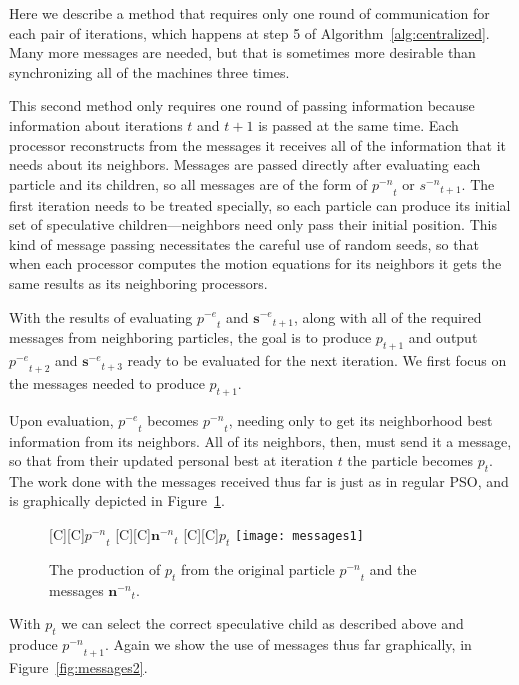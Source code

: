 \documentclass[smallcondensed]{svjour3}
\newcommand{\fig}[1]{Figure~\ref{fig:#1}}
\newcommand{\alg}[1]{Algorithm~\ref{alg:#1}}
\providecommand{\noeval}[1]{\ensuremath{#1^{-e}}}
\providecommand{\nonbest}[1]{\ensuremath{#1^{-n}}}
\providecommand{\p}{\ensuremath{p}}
\providecommand{\s}{\ensuremath{s}}
\providecommand{\sset}{\ensuremath{\mathbf{s}}}
\providecommand{\nset}{\ensuremath{\mathbf{n}}}
\begin{document}

Here we describe a method that requires only one round of communication for
each pair of iterations, which happens at step 5 of \alg{centralized}.  Many
more messages are needed, but that is sometimes more desirable than
synchronizing all of the machines three times.

This second method only requires one round of passing information because
information about iterations $t$ and $t+1$ is passed at the same time.  Each
processor reconstructs from the messages it receives all of the information
that it needs about its neighbors.  Messages are passed directly after
evaluating each particle and its children, so all messages are of the form of
$\nonbest{\p}_t$ or $\nonbest{\s}_{t+1}$.  The first iteration needs to be
treated specially, so each particle can produce its initial set of speculative
children---neighbors need only pass their initial position.  This kind of
message passing necessitates the careful use of random seeds, so that when each
processor computes the motion equations for its neighbors it gets the same
results as its neighboring processors.

With the results of evaluating $\noeval{\p}_t$ and $\noeval{\sset}_{t+1}$,
along with all of the required messages from neighboring particles, the goal is
to produce $\p_{t+1}$ and output $\noeval{\p}_{t+2}$ and $\noeval{\sset}_{t+3}$
ready to be evaluated for the next iteration.  We first focus on the messages
needed to produce $\p_{t+1}$.

Upon evaluation, $\noeval{\p}_t$ becomes $\nonbest{\p}_t$, needing only to get
its neighborhood best information from its neighbors.  All of its neighbors,
then, must send it a message, so that from their updated personal best at
iteration $t$ the particle becomes $\p_t$.  The work done with the messages
received thus far is just as in regular PSO, and is graphically depicted in 
\fig{messages1}.

\begin{figure}
  \centering
  [C][C]{$\nonbest{\p}_{t}$}
  [C][C]{$\nonbest{\nset}_{t}$}
  [C][C]{$\p_{t}$}
  \texttt{[image: messages1]}
  \caption{The production of $\p_{t}$ from the original particle
  $\nonbest{\p}_{t}$ and the messages $\nonbest{\nset}_{t}$.}
  \label{fig:messages1}
\end{figure}

With $\p_t$ we can select the correct speculative child as described above and
produce $\nonbest{\p}_{t+1}$.  Again we show the use of messages thus far
graphically, in \fig{messages2}.  
\end{document}
